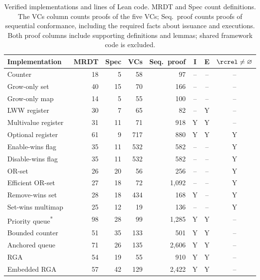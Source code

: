 \begin{table}[t]
\caption{Verified implementations and lines of Lean code. MRDT and Spec count definitions. The VCs column counts proofs of the five VCs; Seq.\ proof counts proofs of sequential conformance, including the required facts about issuance and executions. Both proof columns include supporting definitions and lemmas; shared framework code is excluded.}
\label{tab:implementation}
\centering
\normalsize
\setlength{\tabcolsep}{3pt}
\begin{tabular}{@{}lrrrrccc@{}}
\toprule
Implementation & MRDT & Spec & VCs & Seq.\ proof & I & E & $\rcrel\ne\varnothing$ \\
\midrule
Counter~\cite{neem} & 18 & 5 & 58 & 97 & -- & -- & -- \\
Grow-only set~\cite{shapiro2011comprehensive} & 40 & 15 & 70 & 166 & -- & -- & -- \\
Grow-only map~\cite{shapiro2011comprehensive} & 14 & 5 & 55 & 100 & -- & -- & -- \\
LWW register~\cite{shapiro2011comprehensive} & 30 & 7 & 65 & 82 & -- & Y & -- \\
Multivalue register~\cite{shapiro2011comprehensive} & 31 & 11 & 71 & 918 & Y & Y & -- \\
Optional register~\cite{neem} & 61 & 9 & 717 & 880 & Y & Y & Y \\
Enable-wins flag~\cite{neem} & 35 & 11 & 532 & 582 & -- & -- & Y \\
Disable-wins flag~\cite{neem} & 35 & 11 & 532 & 582 & -- & -- & Y \\
OR-set~\cite{neem} & 26 & 20 & 56 & 256 & -- & -- & Y \\
Efficient OR-set~\cite{neem} & 27 & 18 & 72 & 1,092 & -- & -- & Y \\
Remove-wins set~\cite{neem} & 28 & 18 & 434 & 168 & Y & -- & Y \\
Set-wins multimap~\cite{neem} & 25 & 12 & 19 & 136 & -- & -- & Y \\
Priority queue\textsuperscript{*}~\cite{PriorityQueue2023} & 98 & 28 & 99 & 1,285 & Y & Y & -- \\
Bounded counter~\cite{BalegasBoundedCounter} & 51 & 35 & 133 & 501 & Y & Y & -- \\
Anchored queue~\cite{Roh,Vimala} & 71 & 26 & 135 & 2,606 & Y & Y & -- \\
RGA~\cite{Roh} & 54 & 19 & 55 & 910 & Y & Y & -- \\
Embedded RGA~\cite{Roh} & 57 & 42 & 129 & 2,422 & Y & Y & -- \\

\end{tabular}
\end{table}
